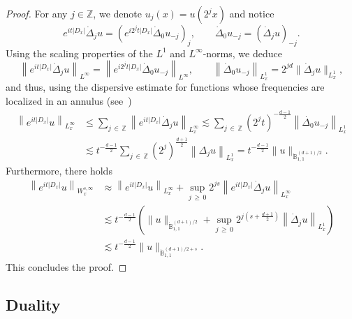\documentclass[AHL,Unicode,longabstracts,published]{cedram}
\newcommand{\Z}{\mathbb{Z}}
\newcommand{\bbB}{\mathbb{B}}
\renewcommand*\le{\leqslant}
\renewcommand*\ge{\geqslant}
\begin{document}
\begin{proof}
For any $j \in \Z$, we denote $u_j(x) = u\left(2^j x \right)$ and notice
\[
e^{i t | D_x | } \dot{\Delta}_j u = \left(e^{i 2^j t | D_x | } \dot{\Delta}_0 u_{-j} \right)_j, \qquad \dot{\Delta}_0 u_{-j} = \left(\dot{\Delta}_j u \right)_{-j}.
\]
Using the scaling properties of the $L^1$ and $L^\infty$-norms, we deduce
\[
\left\| e^{i t | D_x | } \dot{\Delta}_j u \right\|_{L^\infty} = \left\| e^{i 2^j t | D_x | } \dot{\Delta}_0 u_{-j} \right\|_{L^\infty}, \qquad \left\| \dot{\Delta}_0 u_{-j} \right\|_{L^1_x} = 2^{j d } \| \dot{\Delta}_j u \|_{L^1_x},
\]
and thus, using the dispersive estimate for functions whose frequencies are localized in an annulus (see~\cite[Proposition~8.15]{BCD2011})
\begin{align*}
\left\| e^{i t | D_x | } u \right\|_{L^\infty_x} & \le \sum_{j\, \in\,\Z} \left\| e^{i t | D_x | } \dot{\Delta}_j u \right\|_{L^\infty_x} \lesssim \sum_{j\,\in\,\Z} \left(2^j t\right)^{-\frac{d-1}{2}} \left\| \dot{\Delta_0} u_{-j}\right\|_{L^1_x} \\
& \lesssim t^{-\frac{d-1}{2}} \sum_{j\,\in\,\Z} \left(2^j \right)^{\frac{d+1}{2}} \left\| \Delta_j u \right\|_{L^1_x} = t^{-\frac{d-1}{2}} \| u \|_{ \dot{\bbB}^{(d+1)/2}_{1,1} }.
\end{align*}
Furthermore, there holds
\begin{align*}
\left\| e^{i t | D_x | } u \right\|_{W^{s, \infty}_x} & \approx \left\| e^{i t | D_x | } u \right\|_{L^\infty_x} + \sup_{j\,\ge\,0} 2^{j s} \left\| e^{i t | D_x | } \dot{\Delta}_j u \right\|_{L^\infty_x} \\
& \lesssim t^{-\frac{d-1}{2}} \left(\| u \|_{ \dot{\bbB}^{(d+1)/2}_{1,1} } + \sup_{j\,\ge\,0} 2^{j \left(s+\frac{d+1}{2}\right) } \left\| \dot{\Delta}_j u\right\|_{L^1_x}\right) \\
& \lesssim t^{-\frac{d-1}{2}} \| u \|_{ \dot{\bbB}^{(d+1)/2 + s }_{1,1} }.
\end{align*}
This concludes the proof.
\end{proof}

\subsection{Duality}\label{scn:duality}
\end{document}
